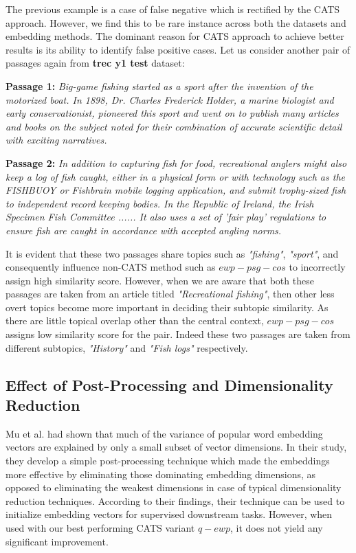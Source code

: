 The previous example is a case of false negative which is rectified by the CATS approach. However, we find this to be rare instance across both the datasets and embedding methods. The dominant reason for CATS approach to achieve better results is its ability to identify false positive cases. Let us consider another pair of passages again from \textbf{trec y1 test} dataset:

\textbf{Passage 1: } \textit{Big-game fishing started as a sport after the invention of the motorized boat.  In 1898, Dr. Charles Frederick Holder, a marine biologist and early conservationist, pioneered this sport and went on to publish many articles and books on the subject noted for their combination of accurate scientific detail with exciting narratives.}

\textbf{Passage 2: } \textit{In addition to capturing fish for food, recreational anglers might also keep a log of fish caught, either in a physical form or with technology such as the FISHBUOY or Fishbrain mobile logging application, and submit trophy-sized fish to independent record keeping bodies. In the Republic of Ireland, the Irish Specimen Fish Committee ...... It also uses a set of 'fair play' regulations to ensure fish are caught in accordance with accepted angling norms.}

It is evident that these two passages share topics such as \textit{"fishing"}, \textit{"sport"}, and consequently influence non-CATS method such as $ewp-psg-cos$ to incorrectly assign high similarity score. However, when we are aware that both these passages are taken from an article titled \textit{"Recreational fishing"}, then other less overt topics become more important in deciding their subtopic similarity. As there are little topical overlap other than the central context, $ewp-psg-cos$ assigns low similarity score for the pair. Indeed these two passages are taken from different subtopics, \textit{"History"} and \textit{"Fish logs"} respectively. 

\subsection{Effect of Post-Processing and Dimensionality Reduction}
Mu et al. \cite{mu2017all} had shown that much of the variance of popular word embedding vectors are explained by only a small subset of vector dimensions. In their study, they develop a simple post-processing technique which made the embeddings more effective by eliminating those dominating embedding dimensions, as opposed to eliminating the weakest dimensions in case of typical dimensionality reduction techniques. According to their findings, their technique can be used to initialize embedding vectors for supervised downstream tasks. However, when used with our best performing CATS variant $q-ewp$, it does not yield any significant improvement.

